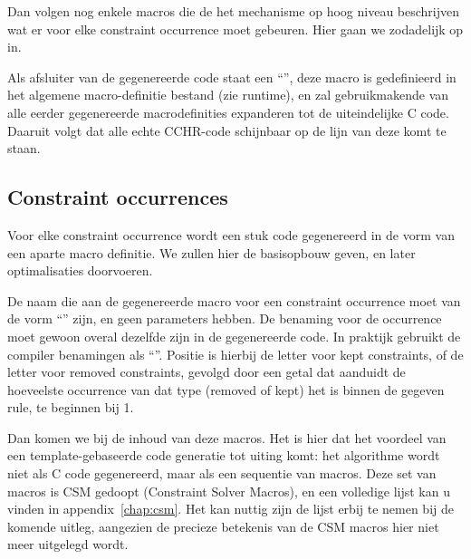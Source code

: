 Dan volgen nog enkele macros die de het mechanisme op hoog niveau beschrijven wat er voor elke constraint occurrence moet gebeuren. Hier gaan we zodadelijk op in.

Als afsluiter van de gegenereerde code staat een ``'', deze macro is gedefinieerd in het algemene macro-definitie bestand (zie runtime), en zal gebruikmakende van alle eerder gegenereerde macrodefinities expanderen tot de uiteindelijke C code. Daaruit volgt dat alle echte CCHR-code schijnbaar op de lijn van deze  komt te staan.

\subsection{Constraint occurrences}

Voor elke constraint occurrence wordt een stuk code gegenereerd in de vorm van een aparte macro definitie. We zullen hier de basisopbouw geven, en later optimalisaties doorvoeren.

De naam die aan de gegenereerde macro voor een constraint occurrence moet van de vorm ``'' zijn, en geen parameters hebben. De benaming voor de occurrence moet gewoon overal dezelfde zijn in de gegenereerde code. In praktijk gebruikt de compiler benamingen als ``''. Positie is hierbij de letter  voor kept constraints, of de letter  voor removed constraints, gevolgd door een getal dat aanduidt de hoeveelste occurrence van dat type (removed of kept) het is binnen de gegeven rule, te beginnen bij 1.

Dan komen we bij de inhoud van deze macros. Het is hier dat het voordeel van een template-gebaseerde code generatie tot uiting komt: het algorithme wordt niet als C code gegenereerd, maar als een sequentie van macros. Deze set van macros is CSM gedoopt (Constraint Solver Macros), en een volledige lijst kan u vinden in appendix~\ref{chap:csm}. Het kan nuttig zijn de lijst erbij te nemen bij de komende uitleg, aangezien de precieze betekenis van de CSM macros hier niet meer uitgelegd wordt.

